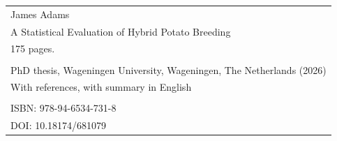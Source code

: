 \newpage
\thispagestyle{empty}
\vspace*{\fill}
\begin{flushleft}
\begin{tabular}{l}
    James Adams                                              \\  
    A Statistical Evaluation of Hybrid Potato Breeding       \\  
    175 pages.                                               \\  
                                                             \\  
    PhD thesis, Wageningen University, Wageningen, The Netherlands (2026) \\  
    With references, with summary in English                 \\  
                                                             \\  
    ISBN: 978-94-6534-731-8                                             \\  
    DOI: 10.18174/681079                                             \\  
\end{tabular}
\end{flushleft}
